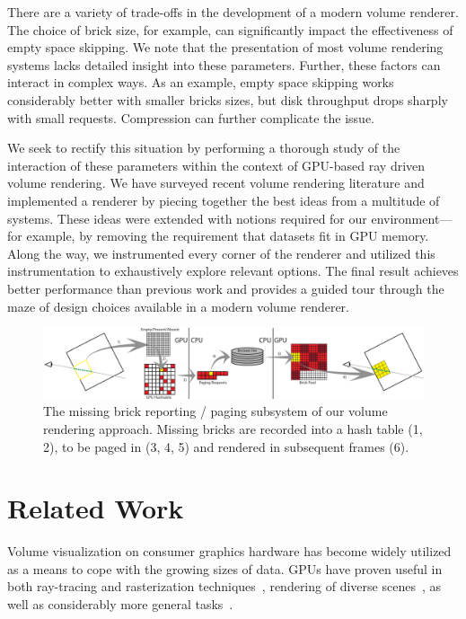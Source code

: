 There are a variety of trade-offs in the development of a modern volume
renderer.  The choice of brick size, for example, can significantly
impact the effectiveness of empty space skipping.  We note that the
presentation of most volume rendering systems lacks detailed insight
into these parameters.  Further, these factors can interact in complex
ways.  As an example, empty space skipping works considerably better
with smaller bricks sizes, but disk throughput drops sharply with small
requests.  Compression can further complicate the issue.

We seek to rectify this situation by performing a thorough study of
the interaction of these parameters within the context of GPU-based
ray driven volume rendering.  We have surveyed recent volume rendering
literature and implemented a renderer by piecing together the best
ideas from a multitude of systems. These ideas were extended with
notions required for our environment---for example, by removing
the requirement that datasets fit in GPU memory.  Along the way,
we instrumented every corner of the renderer and utilized this
instrumentation to exhaustively explore relevant options.  The final
result achieves better performance than previous work and provides a
guided tour through the maze of design choices available in a modern
volume renderer.

\begin{figure}
  \centering
  \includegraphics[width=1.00\linewidth]{images/rg/pipeline.pdf}
  \caption{The missing brick reporting / paging subsystem of our volume
  rendering approach.  Missing bricks are recorded into a hash table
  (1, 2), to be paged in (3, 4, 5) and rendered in subsequent frames
  (6).}
  \label{figrg:flow}
\end{figure}

\section{Related Work}

Volume visualization on consumer graphics hardware has become widely
utilized as a means to cope with the growing sizes of data.  GPUs have
proven useful in both ray-tracing and rasterization
techniques~\cite{Reichl:2012:HybridSurface, Dick:2009:Terrain},
rendering of diverse scenes~\cite{Parker:2010:Optix}, as well
as considerably more general tasks~\cite{Owens:2007:GPGPU}.

